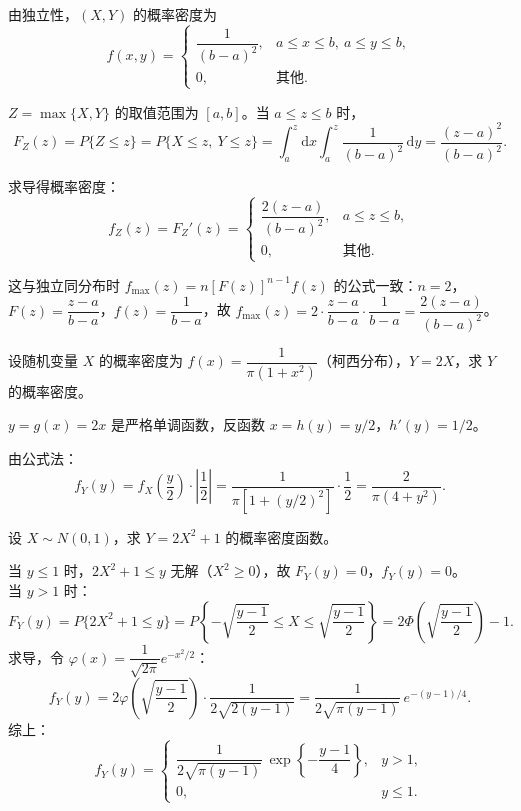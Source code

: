 \documentclass[lang=cn,11pt]{elegantbook}
\begin{document}
\begin{solution}
由独立性，$(X,Y)$ 的概率密度为
\[
f(x,y) = \begin{cases} \dfrac{1}{(b-a)^2}, & a \leqslant x \leqslant b,\ a \leqslant y \leqslant b, \\ 0, & \text{其他}. \end{cases}
\]

$Z = \max\{X, Y\}$ 的取值范围为 $[a, b]$。当 $a \leqslant z \leqslant b$ 时，
\[
F_Z(z) = P\{Z \leqslant z\} = P\{X \leqslant z,\ Y \leqslant z\} = \int_a^z\mathrm{d}x\int_a^z \frac{1}{(b-a)^2}\,\mathrm{d}y = \frac{(z-a)^2}{(b-a)^2}.
\]

求导得概率密度：
\[
f_Z(z) = F_Z'(z) = \begin{cases} \dfrac{2(z-a)}{(b-a)^2}, & a \leqslant z \leqslant b, \\ 0, & \text{其他}. \end{cases}
\]

\begin{note}
这与独立同分布时 $f_{\max}(z) = n[F(z)]^{n-1}f(z)$ 的公式一致：$n=2$，$F(z) = \dfrac{z-a}{b-a}$，$f(z) = \dfrac{1}{b-a}$，故 $f_{\max}(z) = 2 \cdot \dfrac{z-a}{b-a} \cdot \dfrac{1}{b-a} = \dfrac{2(z-a)}{(b-a)^2}$。
\end{note}
\end{solution}

\begin{exercise}[柯西分布线性变换] \label{exer:3-11}
设随机变量 $X$ 的概率密度为 $f(x) = \dfrac{1}{\pi(1+x^2)}$（柯西分布），$Y = 2X$，求 $Y$ 的概率密度。
\end{exercise}

\begin{solution}
$y = g(x) = 2x$ 是严格单调函数，反函数 $x = h(y) = y/2$，$h'(y) = 1/2$。

由公式法：
\[
f_Y(y) = f_X\!\left(\frac{y}{2}\right) \cdot \left|\frac{1}{2}\right| = \frac{1}{\pi\left[1 + (y/2)^2\right]} \cdot \frac{1}{2} = \frac{2}{\pi(4+y^2)}.
\]
\end{solution}

\begin{exercise}[正态平方变换] \label{exer:3-12}
设 $X \sim N(0,1)$，求 $Y = 2X^2 + 1$ 的概率密度函数。
\end{exercise}
\begin{solution}
当 $y \leqslant 1$ 时，$2X^2 + 1 \leqslant y$ 无解（$X^2 \geqslant 0$），故 $F_Y(y) = 0$，$f_Y(y) = 0$。\\
当 $y > 1$ 时：
\[
F_Y(y) = P\{2X^2 + 1 \leqslant y\} = P\!\left\{-\sqrt{\frac{y-1}{2}} \leqslant X \leqslant \sqrt{\frac{y-1}{2}}\right\} = 2\Phi\!\left(\sqrt{\frac{y-1}{2}}\right) - 1.
\]
求导，令 $\varphi(x) = \dfrac{1}{\sqrt{2\pi}}e^{-x^2/2}$：
\[
f_Y(y) = 2\varphi\!\left(\sqrt{\frac{y-1}{2}}\right) \cdot \frac{1}{2\sqrt{2(y-1)}} = \frac{1}{2\sqrt{\pi(y-1)}}\,e^{-(y-1)/4}.
\]
综上：
\[
f_Y(y) = \begin{cases} \dfrac{1}{2\sqrt{\pi(y-1)}}\,\exp\!\left\{-\dfrac{y-1}{4}\right\}, & y > 1, \\ 0, & y \leqslant 1. \end{cases}
\]
\end{solution}
\end{document}
